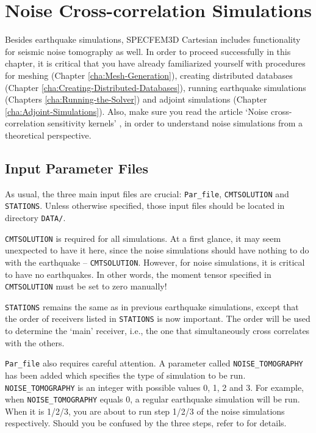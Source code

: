 \chapter{Noise Cross-correlation Simulations}


Besides earthquake simulations, SPECFEM3D Cartesian includes functionality
for seismic noise tomography as well. In order to proceed successfully
in this chapter, it is critical that you have already familiarized
yourself with procedures for meshing (Chapter \ref{cha:Mesh-Generation}),
creating distributed databases (Chapter \ref{cha:Creating-Distributed-Databases}),
running earthquake simulations (Chapters \ref{cha:Running-the-Solver})
and adjoint simulations (Chapter \ref{cha:Adjoint-Simulations}).
Also, make sure you read the article `Noise cross-correlation sensitivity
kernels' \citep{trompetal2010}, in order to understand noise simulations
from a theoretical perspective.


\section{Input Parameter Files}

As usual, the three main input files are crucial: \texttt{Par\_file},
\texttt{CMTSOLUTION} and \texttt{STATIONS}. Unless otherwise specified,
those input files should be located in directory \texttt{DATA/}.\newline


\texttt{CMTSOLUTION} is required for all simulations. At a first glance,
it may seem unexpected to have it here, since the noise simulations
should have nothing to do with the earthquake -- \texttt{CMTSOLUTION}.
However, for noise simulations, it is critical to have no earthquakes.
In other words, the moment tensor specified in \texttt{CMTSOLUTION}
must be set to zero manually!\newline


\texttt{STATIONS} remains the same as in previous earthquake simulations,
except that the order of receivers listed in \texttt{STATIONS} is
now important. The order will be used to determine the `main' receiver,
i.e., the one that simultaneously cross correlates with the others.\newline


\texttt{Par\_file} also requires careful attention. A parameter called
\texttt{NOISE\_TOMOGRAPHY} has been added which specifies the type
of simulation to be run. \texttt{NOISE\_TOMOGRAPHY} is an integer
with possible values 0, 1, 2 and 3. For example, when \texttt{NOISE\_TOMOGRAPHY}
equals 0, a regular earthquake simulation will be run. When it is
1/2/3, you are about to run step 1/2/3 of the noise simulations respectively.
Should you be confused by the three steps, refer to \citet{trompetal2010}
for details.\newline



